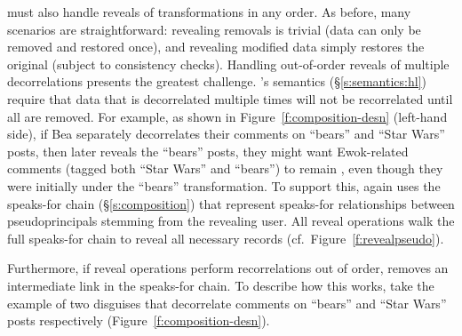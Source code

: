 \sys must also handle reveals of transformations in any order.  As before,
many scenarios are straightforward: revealing removals is trivial (data can
only be removed and restored once), and revealing modified data simply restores
the original (subject to consistency checks).
%
Handling out-of-order reveals of multiple decorrelations presents the greatest
challenge.
%
\sys's semantics (\S\ref{s:semantics:hl}) require that data that is decorrelated
multiple times will not be recorrelated until all \xxs are removed.
%
For example, as shown in Figure~\ref{f:composition-desn} (left-hand side), if Bea
separately decorrelates their comments on ``bears'' and ``Star Wars'' posts,
then later reveals the ``bears'' posts, they might want Ewok-related comments
(tagged both ``Star Wars'' and ``bears'') to remain \xxed, even though they were
initially \xxed under the ``bears'' transformation.
%
%
%
To support this, \sys again uses the speaks-for chain (\S\ref{s:composition}) that represent
speaks-for relationships between pseudoprincipals stemming from the revealing
user.
%
All reveal operations walk the full speaks-for chain to reveal all necessary
records (cf.\ Figure~\ref{f:revealpseudo}).

Furthermore, if reveal operations perform recorrelations out of order, \sys
removes an intermediate link in the speaks-for chain.
%
To describe how this works, take the example of two disguises that decorrelate
comments on ``bears'' and ``Star Wars'' posts respectively
(Figure~\ref{f:composition-desn}). 

